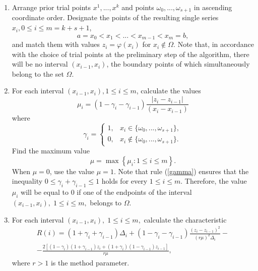 \documentclass[runningheads]{llncs}
\begin{document}
\begin{enumerate}
\item Arrange prior trial points $x^1,...,x^k$ and points $\omega_{0}, ..., \omega_{s+1}$ in ascending coordinate order. Designate the points of the resulting single series $x_i, 0\leq i \leq m = k + s + 1$,
\begin{equation}\label{pointsX}
a = x_0 < x_1 < ... < x_{m-1} < x_{m} = b,
\end{equation}
and match them with values $z_i=\varphi(x_i)$ for $x_i \not\in \Omega$. Note that, in accordance with the choice of trial points at the preliminary step of the algorithm, there will be no interval $(x_{i-1},x_i)$, the boundary points of which simultaneously belong to the set $\Omega$.

\item For each interval $(x_{i-1},x_i ), 1\leq i \leq m$, calculate the values
\begin{equation}\label{mu_i}
\mu_i=(1-\gamma_i-\gamma_{i-1} )  \frac{|z_i-z_{i-1} |}{(x_i-x_{i-1} )}
\end{equation}
where
\begin{equation}\label{gamma}
\gamma_i = 
\begin{cases}
	1, &\text{$x_i \in \{\omega_{0},...,\omega_{s+1}\} $}, \\
	0, &\text{$x_i \not\in \{\omega_{0},...,\omega_{s+1}\}. $}
\end{cases}
\end{equation}
Find the maximum value 
\[
\mu=\max\left\{\mu_i: 1 \leq i \leq m\right\}.
\]
When $\mu=0$, use the value $\mu=1$.
Note that rule (\ref{gamma}) ensures that the inequality $0 \leq \gamma_i+\gamma_{i-1} \leq 1$ holds for every $1 \leq i \leq m$. Therefore, the value $\mu_i$ will be equal to 0 if one of the endpoints of the interval $ (x_{i-1},x_i ), \; 1 \leq i \leq m,$ belongs to $\Omega$.

\item For each interval $(x_{i-1},x_i), \; 1\leq i \leq m,$ calculate the characteristic
\[
\begin{gathered}
R(i)=(1+\gamma_i+\gamma_{i-1} )\Delta_i+(1-\gamma_i-\gamma_{i-1} ) \frac{ (z_i-z_{i-1} )^2}{(r\mu)^2 \Delta_i }-\\
-\frac{2[(1-\gamma_i )(1+\gamma_{i-1} ) z_i+(1+\gamma_i )(1-\gamma_{i-1} ) z_{i-1} ]}{r\mu},
\end{gathered}
\]
where $r>1$ is the method parameter.


\end{enumerate}
\end{document}
